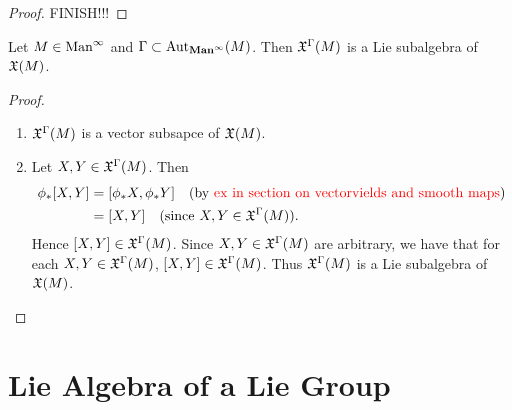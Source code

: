 \documentclass{book}
\begin{document}
\begin{ex} 
\end{ex}

\begin{proof}
	FINISH!!!
\end{proof}

\begin{ex} 
	Let $M \in \text{Man}^{\infty}$ and $\Gamma \subset \operatorname{Aut}_{\operatorname*{\text{\textbf{Man}}^{\infty}}}(M)$. Then $\mathfrak{X}^{\Gamma}(M)$ is a Lie subalgebra of $\mathfrak{X}(M)$.
\end{ex}

\begin{proof}\
	\begin{enumerate}
		\item {} $\mathfrak{X}^{\Gamma}(M)$ is a vector subsapce of $\mathfrak{X}(M)$.
		\item Let $X, Y \in \mathfrak{X}^{\Gamma}(M)$. Then 
		\begin{align*}
			\phi_*[X, Y]
			& = [\phi_*X, \phi_*Y] \quad \text{(by \textcolor{red}{ex in section on vectorvields and smooth maps})} \\ 
			& = [X,Y] \quad \text{(since $X,Y \in \mathfrak{X}^{\Gamma}(M)$)}.
		\end{align*}
		Hence $[X, Y] \in \mathfrak{X}^{\Gamma}(M)$. Since $X, Y \in \mathfrak{X}^{\Gamma}(M)$ are arbitrary, we have that for each $X, Y \in \mathfrak{X}^{\Gamma}(M)$, $[X, Y] \in \mathfrak{X}^{\Gamma}(M)$. Thus $\mathfrak{X}^{\Gamma}(M)$ is a Lie subalgebra of $\mathfrak{X}(M)$.
	\end{enumerate}
\end{proof}










































\section{Lie Algebra of a Lie Group}
\end{document}
